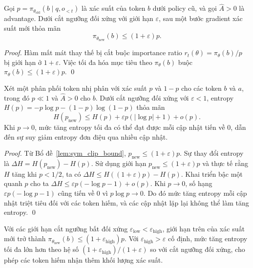 \documentclass[11pt,a4paper]{article}
\begin{document}
\begin{lemma}\label{lem:sym_clip_bound}
Gọi \(p = \pi_{\theta_{\text{old}}}(b \mid q, o_{<t})\) là xác suất của token \(b\) dưới policy cũ, và gọi \(\hat{A}>0\) là advantage. Dưới cắt ngưỡng đối xứng với giới hạn \(\varepsilon\), sau một bước gradient xác suất mới thỏa mãn
\[
\pi_{\theta_{\text{new}}}(b) \le (1+\varepsilon)p.
\]
\end{lemma}

\begin{proof}
Hàm mất mát thay thế bị cắt buộc importance ratio \(r_t(\theta) = \pi_\theta(b)/p\) bị giới hạn ở \(1+\varepsilon\). Việc tối đa hóa mục tiêu theo \(\pi_\theta(b)\) buộc \(\pi_\theta(b) \le (1+\varepsilon)p\). \qed
\end{proof}

\begin{lemma}\label{lem:entropy_collapse}
Xét một phân phối token nhị phân với xác suất \(p\) và \(1-p\) cho các token \(b\) và \(a\), trong đó \(p\ll 1\) và \(\hat{A}>0\) cho \(b\). Dưới cắt ngưỡng đối xứng với \(\varepsilon<1\), entropy \(H(p) = -p\log p - (1-p)\log(1-p)\) thỏa mãn
\[
H(p_{\text{new}}) \le H(p) + \varepsilon p(|\log p| + 1) + o(p).
\]
Khi \(p\to0\), mức tăng entropy tối đa có thể đạt được mỗi cập nhật tiến về 0, dẫn đến sự suy giảm entropy đơn điệu qua nhiều cập nhật.
\end{lemma}

\begin{proof}
Từ Bổ đề~\ref{lem:sym_clip_bound}, \(p_{\text{new}} \le (1+\varepsilon)p\). Sự thay đổi entropy là
\(\Delta H = H(p_{\text{new}}) - H(p)\). Sử dụng giới hạn \(p_{\text{new}} \le (1+\varepsilon)p\) và thực tế rằng \(H\) tăng khi \(p<1/2\), ta có
\(\Delta H \le H((1+\varepsilon)p) - H(p)\). Khai triển bậc một quanh \(p\) cho ta
\(\Delta H \le \varepsilon p (-\log p -1) + o(p)\). Khi \(p\to0\), số hạng \(\varepsilon p (-\log p -1)\) cũng tiến về 0 vì \(p\log p\to0\). Do đó mức tăng entropy mỗi cập nhật triệt tiêu đối với các token hiếm, và các cập nhật lặp lại không thể làm tăng entropy. \qed
\end{proof}

\begin{lemma}\label{lem:asym_restores}
Với các giới hạn cắt ngưỡng bất đối xứng \(\varepsilon_{\text{low}}<\varepsilon_{\text{high}}\), giới hạn trên của xác suất mới trở thành \(\pi_{\theta_{\text{new}}}(b) \le (1+\varepsilon_{\text{high}})p\). Với \(\varepsilon_{\text{high}}>\varepsilon\) cố định, mức tăng entropy tối đa lớn hơn theo hệ số \((1+\varepsilon_{\text{high}})/(1+\varepsilon)\) so với cắt ngưỡng đối xứng, cho phép các token hiếm nhận thêm khối lượng xác suất.
\end{lemma}
\end{document}
